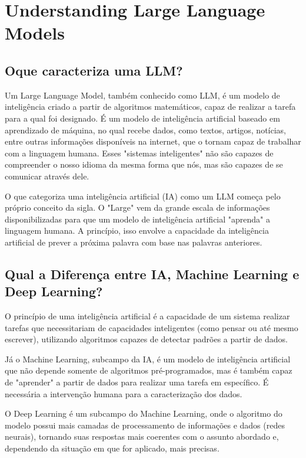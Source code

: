 \section{Understanding Large Language Models}

\subsection{Oque caracteriza uma LLM?}
Um Large Language Model, também conhecido como LLM, é um modelo de inteligência criado a partir de algoritmos matemáticos, capaz de realizar a tarefa para a qual foi designado. É um modelo de inteligência artificial baseado em aprendizado de máquina, no qual recebe dados, como textos, artigos, notícias, entre outras informações disponíveis na internet, que o tornam capaz de trabalhar com a linguagem humana. Esses "sistemas inteligentes" não são capazes de compreender o nosso idioma da mesma forma que nós, mas são capazes de se comunicar através dele.

O que categoriza uma inteligência artificial (IA) como um LLM começa pelo próprio conceito da sigla. O "Large" vem da grande escala de informações disponibilizadas para que um modelo de inteligência artificial "aprenda" a linguagem humana. A princípio, isso envolve a capacidade da inteligência artificial de prever a próxima palavra com base nas palavras anteriores.

\subsection{Qual a Diferença entre IA, Machine Learning e Deep Learning?}
O princípio de uma inteligência artificial é a capacidade de um sistema realizar tarefas que necessitariam de capacidades inteligentes (como pensar ou até mesmo escrever), utilizando algoritmos capazes de detectar padrões a partir de dados.

Já o Machine Learning, subcampo da IA, é um modelo de inteligência artificial que não depende somente de algoritmos pré-programados, mas é também capaz de "aprender" a partir de dados para realizar uma tarefa em específico. É necessária a intervenção humana para a caracterização dos dados.

O Deep Learning é um subcampo do Machine Learning, onde o algoritmo do modelo possui mais camadas de processamento de informações e dados (redes neurais), tornando suas respostas mais coerentes com o assunto abordado e, dependendo da situação em que for aplicado, mais precisas.

